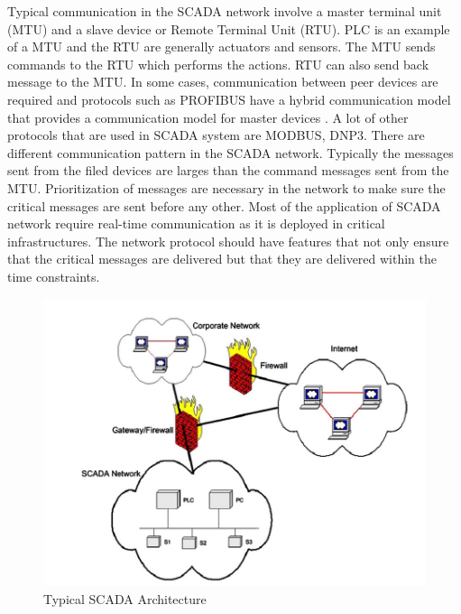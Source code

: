 \documentclass[letterpaper, 10 pt, conference]{ieeeconf}  %
\begin{document}
\begin{itemize}
Typical communication in the SCADA network involve a master terminal unit (MTU) and a slave device or Remote Terminal Unit (RTU). PLC is an example of a MTU and the RTU are generally actuators and sensors. The MTU sends commands to the RTU which performs the actions. RTU can also send back message to the MTU. In some cases, communication between peer devices are required and protocols such as PROFIBUS have a hybrid communication model that provides a communication model for master devices \cite{c9}. A lot of other protocols that are used in SCADA system are MODBUS, DNP3. There are different communication pattern in the SCADA network. Typically the messages sent from the filed devices are larges than the command messages sent from the MTU. Prioritization of messages are necessary in the network to make sure the critical messages are sent before any other. Most of the application of SCADA network require real-time communication as it is deployed in critical infrastructures. The network protocol should have features that not only ensure that the critical messages are delivered but that they are delivered within the time constraints.
\begin{figure}
\centering
\includegraphics[width=.45\textwidth]{scada_arc}
\caption{Typical SCADA Architecture \cite{c13}}
\end{figure}
\end{itemize}
\end{document}
